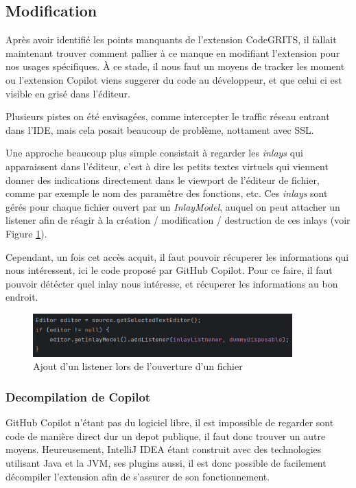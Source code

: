\subsection{Modification}

Après avoir identifié les points manquants de l'extension CodeGRITS, il fallait maintenant trouver comment pallier à ce manque
en modifiant l'extension pour nos usages spécifiques.
À ce stade, il nous faut un moyens de tracker les moment ou l'extension Copilot viens suggerer du code au développeur, et que celui ci est visible
en grisé dans l'éditeur.

Plusieurs pistes on été envisagées, comme intercepter le traffic réseau entrant dans l'IDE, mais cela posait beaucoup de problème, nottament avec SSL.

Une approche beaucoup plus simple consistait à regarder les \emph{inlays} qui apparaissent dans l'éditeur,
c'est à dire les petits textes virtuels qui viennent donner des indications directement dans le viewport de l'éditeur de fichier,
comme par exemple le nom des paramêtre des fonctions, etc.
Ces \emph{inlays} sont gérés pour chaque fichier ouvert par un \emph{InlayModel}, auquel on peut attacher un listener afin de réagir
à la création / modification / destruction de ces inlays (voir Figure \ref{inlay-listener}).

Cependant, un fois cet accès acquit, il faut pouvoir récuperer les informations qui nous intéressent, ici le code proposé par GitHub Copilot.
Pour ce faire, il faut pouvoir détécter quel inlay nous intéresse, et récuperer les informations au bon endroit.

\begin{figure}
  \centering
  \includegraphics[width=10cm]{images/inlay-listener.png}
  \caption{Ajout d'un listener lors de l'ouverture d'un fichier}
  \label{inlay-listener}
\end{figure}


\subsubsection{Decompilation de Copilot}

GitHub Copilot n'étant pas du logiciel libre, il est impossible de regarder sont code de manière direct dur un depot publique, il faut donc trouver un autre moyens.
Heureusement, IntelliJ IDEA étant construit avec des technologies utilisant Java et la JVM, ses plugins aussi, il est donc possible de facilement décompiler l'extension afin de s'assurer de son fonctionnement.

